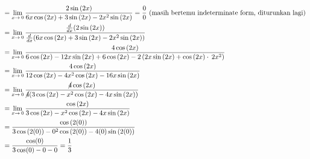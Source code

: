 \documentclass[12pt]{article}
\begin{document}
\begin{fleqn}[2em]
\begin{align*}
{\begin{aligned}
  & = \lim _{x\to \:0} \frac{2\sin \left(2x\right)}{6x\cos \left(2x\right)+3\sin \left(2x\right)-2x^2\sin \left(2x\right)} = \frac{0}{0} \text{ (masih bertemu indeterminate form, diturunkan lagi)} \\
  & = \lim _{x\to \:0} \frac{\frac{d}{dx}(2\sin \left(2x\right))}{\frac{d}{dx}(6x\cos \left(2x\right)+3\sin \left(2x\right)-2x^2\sin \left(2x\right))} \\
  & = \lim _{x\to \:0} \frac{4\cos \left(2x\right)}{6\cos \left(2x\right)-12x\sin \left(2x\right)+6\cos \left(2x\right)-2\left(2x\sin \left(2x\right)+\cos \left(2x\right)\cdot \:2x^2\right)} \\
  & = \lim _{x\to \:0} \frac{4\cos \left(2x\right)}{12\cos \left(2x\right)-4x^2\cos \left(2x\right)-16x\sin \left(2x\right)} \\
  & = \lim _{x\to \:0} \frac{\cancel{4}\cos \left(2x\right)}{\cancel{4}(3\cos \left(2x\right)-x^2\cos \left(2x\right)-4x\sin \left(2x\right))} \\
  & = \lim _{x\to \:0}\frac{\cos \left(2x\right)}{3\cos \left(2x\right)-x^2\cos \left(2x\right)-4x\sin \left(2x\right)} \\
  & = \frac{\cos \left(2(0)\right)}{3\cos \left(2(0)\right)-0^2\cos \left(2(0)\right)-4(0)\sin \left(2(0)\right)} \\
  & = \frac{\cos(0)}{3\cos(0) - 0 - 0} = \frac{1}{3}
\end{aligned}
}
\end{align*}

\end{fleqn}
\end{document}
